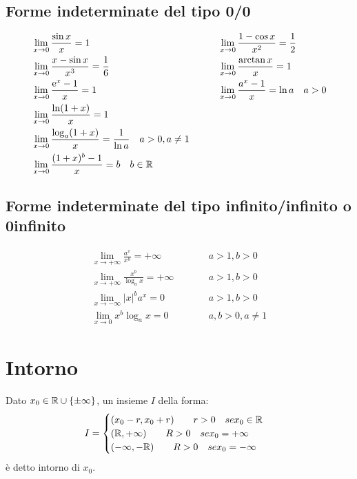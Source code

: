 \subsection{Forme indeterminate del tipo 0/0}
\begin{align*}
&\lim_{x\to0}{\frac{\sin x}{x}}= 1                & \qquad & \lim_{x\to0}{\frac{1-\cos x}{x^2}}=\frac{1}{2} \\
&\lim_{x\to0}{\frac{x-\sin x}{x^3}}=\frac{1}{6}   & \qquad & \lim_{x\to0}{\frac{\arctan x}{x}}= 1 \\
&\lim_{x\to0}{\frac{\mathrm{e}^x-1}{x}}= 1                & \qquad & \lim_{x\to0}{\frac{a^x-1}{x}}= \ln a \quad a>0 \\
&\lim_{x\to0}{\frac{\ln(1+x)}{x}}= 1              & \qquad & \\
&\lim_{x\to0}{\frac{\log_a(1+x)}{x}}= \frac{1}{\ln a} \quad a>0,a\neq1 & \qquad & \\
&\lim_{x\to0}{\frac{(1+x)^b-1}{x}}=b \quad b\in\mathbb{R} & \qquad & 
\end{align*}

\subsection{Forme indeterminate del tipo infinito/infinito o 0infinito}
\begin{align*}
&\lim_{x\to+\infty}{\frac{a^x}{x^b}}=+\infty & \qquad & a>1,b>0 & \\
&\lim_{x\to+\infty}{\frac{x^b}{\log_a x}}=+\infty & \qquad & a>1,b>0 & \\
&\lim_{x\to-\infty}{|x|^b a^x}=0 & \qquad & a>1,b>0 & \\
&\lim_{x\to0}{x^b \log_a x}=0 & \qquad & a,b>0,a\neq 1 &
\end{align*}

\section{Intorno}
Dato $x_0\in\mathbb{R}\cup\{\pm\infty\}$, un insieme $I$ della forma:
\begin{equation*}
I=
\begin{cases}
(x_0-r,x_0+r) \qquad r>0 \quad se x_0\in\mathbb{R} \\
(\mathbb{R},+\infty) \qquad R>0 \quad se x_0=+\infty \\
(-\infty,-\mathbb{R}) \qquad R>0 \quad se x_0=-\infty
\end{cases}
\end{equation*}
è detto intorno di $x_0$.

